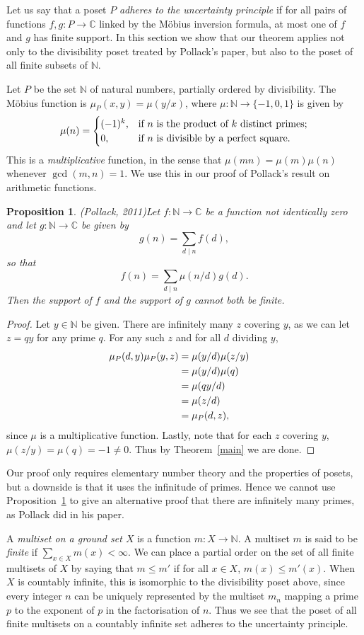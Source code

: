 \documentclass[11pt]{amsart}
\newtheorem{proposition}[theorem]{Proposition}
\theoremstyle{myexample}
\theoremstyle{myremark}
\theoremstyle{conjecture}
\numberwithin{equation}{section}
\def\divides{\mid}
\def\CC{\mathbb{C}}
\def\NN{\mathbb{N}}
\begin{document}
Let us say that a poset $P$ {\it adheres to the uncertainty principle} if for all pairs of functions
$f,g : P\to \CC$ linked by the M\"obius inversion formula, at most one of $f$ and $g$ has finite support.
In this section we show that our theorem applies not only to the divisibility poset treated by Pollack's
paper, but also to the poset of all finite subsets of $\NN$.

\medskip{}\enspace
Let $P$ be the set $\NN$ of natural numbers,
partially ordered by divisibility.
The M\"obius function is $\mu_P(x,y) = \mu(y/x)$, where $\mu :\NN \to \{-1,0,1\}$ is given by
$$ \mu(n) = \begin{cases}
(-1)^k, & \textrm{if $n$ is the product of $k$ distinct primes;}\cr
0, & \textrm{if $n$ is divisible by a perfect square.}\cr
\end{cases}$$
This is a {\it multiplicative} function, in the sense that $\mu(mn) = \mu(m)\mu(n)$ whenever
$\gcd(m,n) = 1$. We use this in our proof of Pollack's result on arithmetic functions.

\begin{proposition}{\rm({\it Pollack,} 2011)}\label{primes}
Let $f:\NN\to \CC$ be a function not identically
zero and let $g:\NN\to \CC$ be given by
$$g(n) = \sum_{d\divides n} f(d),$$
so that
$$f(n) = \sum_{d\divides n} \mu(n/d) g(d).$$
Then the support of $f$ and the support of $g$ cannot both be finite.
\end{proposition}

\begin{proof}
Let $y\in \NN$ be given. There are infinitely many $z$ covering $y$, as we can let $z = qy$ for any prime
$q$. For any such $z$ and for all $d$ dividing $y$,
\begin{align*}
\mu_P(d,y)\mu_P(y,z) &= \mu(y/d)\mu(z/y) \cr
&= \mu(y/d)\mu(q) \cr
&= \mu(qy/d) \cr
&= \mu(z/d) \cr
&= \mu_P(d,z),
\end{align*}
since $\mu$ is a multiplicative function. Lastly, note that for each $z$ covering $y$,
$\mu(z/y) = \mu(q) = -1 \ne 0$. Thus by Theorem~\ref{main} we are done.
\end{proof}

Our proof only requires elementary number theory and the properties of posets, but a downside is that
it uses the infinitude of primes. Hence we cannot use Proposition~\ref{primes} to give
an alternative proof that there are infinitely many primes, as Pollack did in his paper.

\medskip{}\enspace
A {\it multiset on a ground set $X$} is a function $m : X\to \NN$. A multiset $m$ is said to be {\it finite}
if $\sum_{x\in X} m(x) <\infty$. We can place a partial order on the set of all finite multisets of $X$
by saying that $m\le m'$ if for all $x\in X$, $m(x)\le m'(x)$. When $X$ is countably infinite, this
is isomorphic to the divisibility poset above, since every integer $n$ can be uniquely represented by
the multiset $m_n$ mapping a prime $p$ to the exponent of $p$ in the factorisation of $n$. Thus we see
that the poset of all finite multisets on a countably infinite set adheres to the uncertainty principle.
\end{document}
